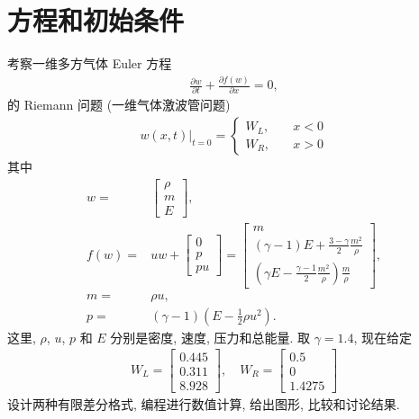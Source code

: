 \documentclass[10.5pt
]{article}
\begin{document}
\section{方程和初始条件}
考察一维多方气体 Euler 方程\citep{Jeffrey1964}
\begin{align}
\frac{\partial w}{\partial t} + \frac{\partial f(w)}{\partial
x}= 0,\label{Eqn:Euler}
\end{align}
的 Riemann 问题 (一维气体激波管问题)
\begin{align}
w(x,t)|_{t=0} = \left\{ \begin{array}{ll}
W_L, & \quad x < 0 \\
W_R, & \quad x > 0
\end{array} \right.
\end{align}
其中
\begin{align}
w =& \left[\begin{array}{c}
\rho\\
m\\
E
\end{array}\right],
\\
f(w) =& u w + \left[\begin{array}{c}
0\\
p\\
p u
\end{array}\right] = \left[\begin{array}{c}
m
\\
(\gamma - 1) E + \frac{3 - \gamma}{2} \frac{m^2}{\rho}
\\
(\gamma E - \frac{\gamma - 1}{2} \frac{m^2}{\rho}) \frac{m}{\rho}
\end{array}\right],
\\
m =& \rho u,
\\
p =& (\gamma - 1)(E - \frac{1}{2} \rho u^2).
\end{align}
这里, $\rho$, $u$, $p$ 和 $E$ 分别是密度, 速度, 压力和总能量. 取 $\gamma=1.4$,
现在给定\citep{Harten1983}
\begin{align}
    W_L = \left[\begin{array}{l}
    0.445\\
    0.311\\
    8.928
    \end{array}\right], \quad W_R = \left[\begin{array}{l}
    0.5\\
    0\\
    1.4275
    \end{array}\right]
\end{align}
设计两种有限差分格式, 编程进行数值计算, 给出图形, 比较和讨论结果.
\end{document}
